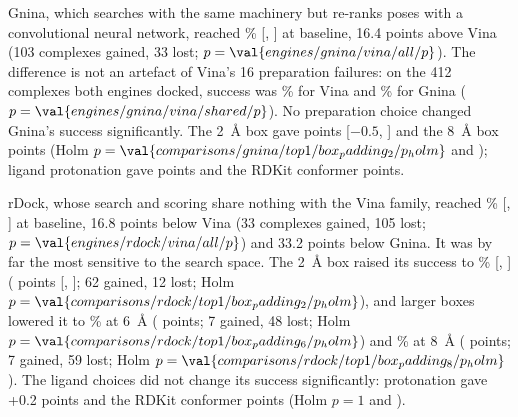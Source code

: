 Gnina, which searches with the same machinery but re-ranks poses with a convolutional
neural network, reached \% [, ] at baseline, 16.4 points above Vina (103
complexes gained, 33 lost; $p = \val{engines/gnina/vina/all/p}$). The difference is not an artefact of
Vina's 16 preparation failures: on the 412 complexes both engines docked, success was
\% for Vina and \% for Gnina ($p = \val{engines/gnina/vina/shared/p}$). No preparation choice
changed Gnina's success significantly. The \SI{2}{\angstrom} box gave  points [$-0.5$, ] and the
\SI{8}{\angstrom} box  points (Holm $p = \val{comparisons/gnina/top1/box_padding_2/p_holm}$ and ); ligand protonation gave
 points and the RDKit conformer  points.

rDock, whose search and scoring share nothing with the Vina family, reached \% [,
] at baseline, 16.8 points below Vina (33 complexes gained, 105 lost;
$p = \val{engines/rdock/vina/all/p}$) and 33.2 points below Gnina. It was by far the most sensitive to
the search space. The \SI{2}{\angstrom} box raised its success to \% [, ]
( points [, ]; 62 gained, 12 lost; Holm $p = \val{comparisons/rdock/top1/box_padding_2/p_holm}$), and larger boxes lowered
it to \% at \SI{6}{\angstrom} ( points; 7 gained, 48 lost; Holm
$p = \val{comparisons/rdock/top1/box_padding_6/p_holm}$) and \% at \SI{8}{\angstrom} ( points; 7 gained, 59
lost; Holm $p = \val{comparisons/rdock/top1/box_padding_8/p_holm}$). The ligand choices did not change its success
significantly: protonation gave +0.2 points and the RDKit conformer  points (Holm
$p = 1$ and ).


